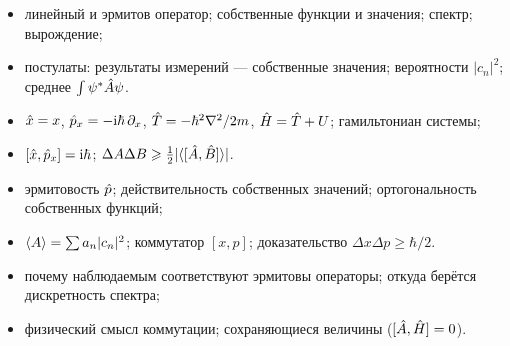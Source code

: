 \begin{examcheck}
\begin{itemize}
 \item линейный и эрмитов оператор; собственные функции и значения; спектр; вырождение;
 \item постулаты: результаты измерений — собственные значения; вероятности $|c_n|^2$; среднее $\int\psi^*\hat{A}\psi$.
\end{itemize}
\begin{itemize}
 \item $\hat{x}=x$, $\hat{p}_x=-\mathrm{i}\hbar\,\partial_x$, $\hat{T}=-\hbar^2\nabla^2/2m$, $\hat{H}=\hat{T}+U$; гамильтониан системы;
 \item $[\hat{x},\hat{p}_x]=\mathrm{i}\hbar$; $\Delta A\Delta B\geqslant\frac12|\langle[\hat{A},\hat{B}]\rangle|$.
\end{itemize}
\begin{itemize}
 \item эрмитовость $\hat{p}$; действительность собственных значений; ортогональность собственных функций;
 \item $\langle A\rangle=\sum a_n|c_n|^2$; коммутатор $[x,p]$; доказательство $\Delta x\Delta p\ge\hbar/2$.
\end{itemize}
\begin{itemize}
 \item почему наблюдаемым соответствуют эрмитовы операторы; откуда берётся дискретность спектра;
 \item физический смысл коммутации; сохраняющиеся величины ($[\hat{A},\hat{H}]=0$).
\end{itemize}
\end{examcheck}
